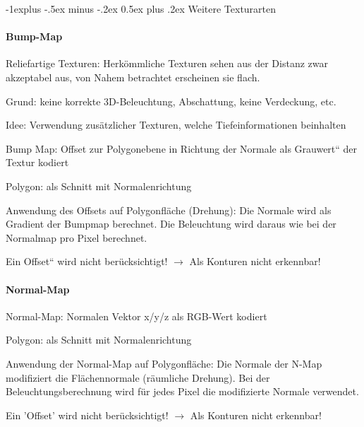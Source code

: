 \documentclass[landscape]{article}
\makeatletter
\renewcommand{\subsection}{\@startsection{subsection}{2}{0mm}%
                                {-1explus -.5ex minus -.2ex}%
                                {0.5ex plus .2ex}%
                                {\normalfont\normalsize\bfseries}}
\makeatother
\begin{document}
\begin{multicols}{3}
  \subsection{ Weitere Texturarten}
  \paragraph{Bump-Map}
  \begin{itemize*}
    \item Reliefartige Texturen: Herkömmliche Texturen sehen aus der Distanz zwar akzeptabel aus, von Nahem betrachtet erscheinen sie flach.
    \item Grund: keine korrekte 3D-Beleuchtung, Abschattung, keine Verdeckung, etc.
    \item Idee: Verwendung zusätzlicher Texturen, welche Tiefeinformationen beinhalten
  \end{itemize*}
  \begin{itemize*}
    \item Bump Map: Offset zur Polygonebene in Richtung der Normale als Grauwert“ der Textur kodiert
    \item Polygon: als Schnitt mit Normalenrichtung
    \item Anwendung des Offsets auf Polygonfläche (Drehung): Die Normale wird als Gradient der Bumpmap berechnet. Die Beleuchtung wird daraus wie bei der Normalmap pro Pixel berechnet.
    \item Ein Offset“ wird nicht berücksichtigt! $\rightarrow$ Als Konturen nicht erkennbar!
  \end{itemize*}
  
  
  \paragraph{Normal-Map}
  \begin{itemize*}
    \item Normal-Map: Normalen Vektor x/y/z als RGB-Wert kodiert
    \item Polygon: als Schnitt mit Normalenrichtung
    \item Anwendung der Normal-Map auf Polygonfläche: Die Normale der N-Map modifiziert die Flächennormale (räumliche Drehung). Bei der Beleuchtungsberechnung wird für jedes Pixel die modifizierte Normale verwendet.
    \item Ein 'Offset' wird nicht berücksichtigt! $\rightarrow$ Als Konturen nicht erkennbar!
  \end{itemize*}
  

\end{multicols}
\end{document}
